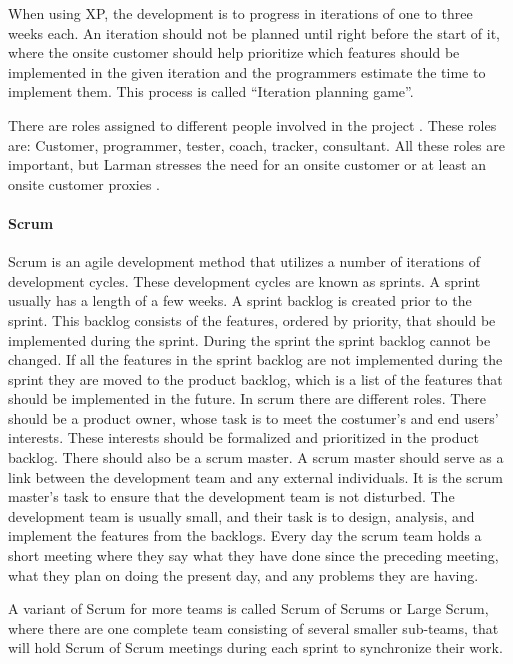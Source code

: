 When using XP, the development is to progress in iterations of one to three weeks each.
An iteration should not be planned until right before the start of it, where the onsite customer should help prioritize which features should be implemented in the given iteration and the programmers estimate the time to implement them.
This process is called ``Iteration planning game''.

There are roles assigned to different people involved in the project \cite[p.~145]{Larman04}.
These roles are: Customer, programmer, tester, coach, tracker, consultant.
All these roles are important, but Larman stresses the need for an onsite customer or at least an onsite customer proxies \cite[p.~152-156]{Larman04}.

\paragraph{Scrum}
Scrum is an agile development method that utilizes a number of iterations of development cycles.
These development cycles are known as sprints.
A sprint usually has a length of a few weeks.
A sprint backlog is created prior to the sprint. 
This backlog consists of the features, ordered by priority, that should be implemented during the sprint.
During the sprint the sprint backlog cannot be changed.
If all the features in the sprint backlog are not implemented during the sprint they are moved to the product backlog, which is a list of the features that should be implemented in the future.
In scrum there are different roles. 
There should be a product owner, whose task is to meet the costumer's and end users' interests. 
These interests should be formalized and prioritized in the product backlog.
There should also be a scrum master. 
A scrum master should serve as a link between the development team and any external individuals.
It is the scrum master's task to ensure that the development team is not disturbed.
The development team is usually small, and their task is to design, analysis, and implement the features from the backlogs.
Every day the scrum team holds a short meeting where they say what they have done since the preceding meeting, what they plan on doing the present day, and any problems they are having.

A variant of Scrum for more teams is called Scrum of Scrums or Large Scrum, where there are one complete team consisting of several smaller sub-teams, that will hold Scrum of Scrum meetings during each sprint to synchronize their work.

